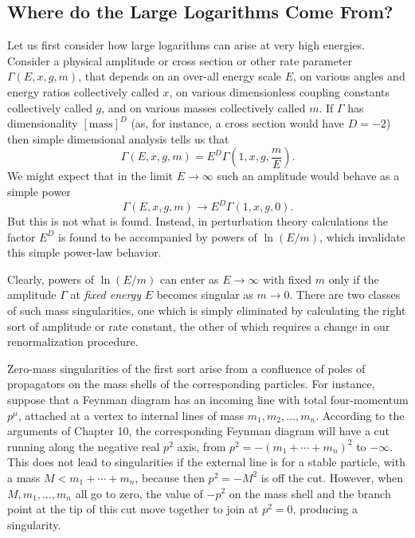 \subsection{Where do the Large Logarithms Come From?}
\label{sec:18.1}

Let us first consider how large logarithms can arise at very high energies.
Consider a physical amplitude or cross section or other rate parameter
$\Gamma(E,x,g,m)$, that depends on an over-all energy scale $E$, on various
angles and energy ratios collectively called $x$, on various dimensionless
coupling constants collectively called $g$, and on various masses
collectively called $m$. If $\Gamma$ has dimensionality $[\mathrm{mass}]^D$
(as, for instance, a cross section would have $D=-2$) then simple dimensional
analysis tells us that
\begin{equation}
 \Gamma(E,x,g,m)=E^D\Gamma\left(1,x,g,\frac{m}{E}\right) .
 \tag{18.1.1}
 \label{eq:18.1.1}
\end{equation}
We might expect that in the limit $E\to\infty$ such an amplitude would behave
as a simple power
\[
 \Gamma(E,x,g,m)\longrightarrow E^D\Gamma(1,x,g,0) .
\]
But this is not what is found. Instead, in perturbation theory calculations
the factor $E^D$ is found to be accompanied by powers of $\ln(E/m)$, which
invalidate this simple power-law behavior.

Clearly, powers of $\ln(E/m)$ can enter as $E\to\infty$ with fixed $m$ only if
the amplitude $\Gamma$ at \emph{fixed energy} $E$ becomes singular as
$m\to0$. There are two classes of such mass singularities, one which is
simply eliminated by calculating the right sort of amplitude or rate
constant, the other of which requires a change in our renormalization
procedure.

Zero-mass singularities of the first sort arise from a confluence of poles of
propagators on the mass shells of the corresponding particles. For instance,
suppose that a Feynman diagram has an incoming line with total four-momentum
$p^\mu$, attached at a vertex to internal lines of mass
$m_1,m_2,\ldots,m_n$. According to the arguments of Chapter 10, the
corresponding Feynman diagram will have a cut running along the negative real
$p^2$ axis, from $p^2=-(m_1+\cdots+m_n)^2$ to $-\infty$. This does not lead to
singularities if the external line is for a stable particle, with a mass
$M<m_1+\cdots+m_n$, because then $p^2=-M^2$ is off the cut. However, when
$M,m_1,\ldots,m_n$ all go to zero, the value of $-p^2$ on the mass shell and
the branch point at the tip of this cut move together to join at $p^2=0$,
producing a singularity.

